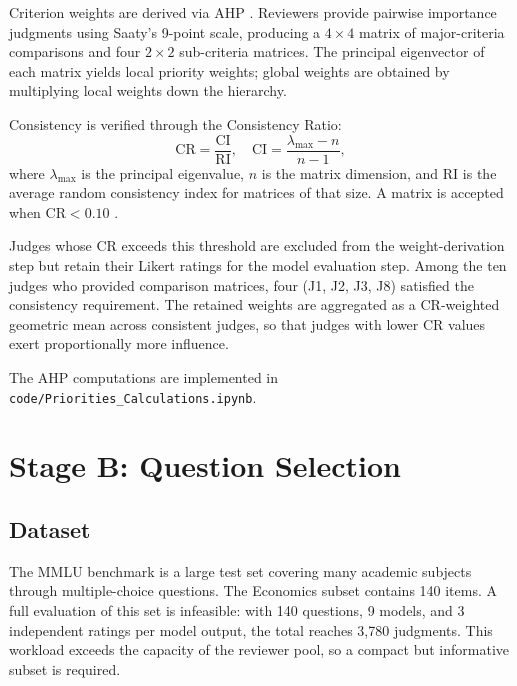 Criterion weights are derived via AHP \citep{saaty1987ahp}. Reviewers provide
pairwise importance judgments using Saaty's 9-point scale, producing a $4 \times 4$
matrix of major-criteria comparisons and four $2 \times 2$ sub-criteria matrices.
The principal eigenvector of each matrix yields local priority weights; global
weights are obtained by multiplying local weights down the hierarchy.

Consistency is verified through the Consistency Ratio:
\begin{equation}
  \mathrm{CR} = \frac{\mathrm{CI}}{\mathrm{RI}}, \quad
  \mathrm{CI} = \frac{\lambda_{\max} - n}{n - 1},
  \label{eq:cr}
\end{equation}
where $\lambda_{\max}$ is the principal eigenvalue, $n$ is the matrix dimension, and
$\mathrm{RI}$ is the average random consistency index for matrices of that size. A
matrix is accepted when $\mathrm{CR} < 0.10$ \citep{saaty1987ahp}.

Judges whose CR exceeds this threshold are excluded from the weight-derivation step
but retain their Likert ratings for the model evaluation step. Among the ten judges
who provided comparison matrices, four (J1, J2, J3, J8) satisfied the consistency
requirement. The retained weights are aggregated as a CR-weighted geometric mean
across consistent judges, so that judges with lower CR values exert proportionally
more influence.

The AHP computations are implemented in \texttt{code/Priorities\_Calculations.ipynb}.

\section{Stage B: Question Selection}
\label{sec:meth-qselect}

\subsection{Dataset}
\label{subsec:meth-dataset}

The MMLU benchmark \citep{hendrycks2021mmlu} is a large test set covering many
academic subjects through multiple-choice questions. The Economics subset contains
140 items. A full evaluation of this set is infeasible: with 140 questions, 9 models,
and 3 independent ratings per model output, the total reaches 3{,}780 judgments.
This workload exceeds the capacity of the reviewer pool, so a compact but informative
subset is required.

